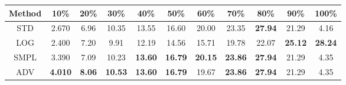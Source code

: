 \documentclass{standalone}
\begin{document}
\begin{tabular}{c|cccccccccc}
      \toprule
      Method & 10\% & 20\% & 30\% & 40\% & 50\% & 60\% & 70\% & 80\% & 90\% & 100\% \\
      \midrule
STD & 2.670 & 6.96 & 10.35 & 13.55 & 16.60 & 20.00 & 23.35 & \textbf{27.94} & 21.29 & 4.16\\
LOG & 2.400 & 7.20 & 9.91 & 12.19 & 14.56 & 15.71 & 19.78 & 22.07 & \textbf{25.12} & \textbf{28.24}\\
SMPL & 3.390 & 7.09 & 10.23 & \textbf{13.60} & \textbf{16.79} & \textbf{20.15} & \textbf{23.86} & \textbf{27.94} & 21.29 & 4.35\\
ADV & \textbf{4.010} & \textbf{8.06} & \textbf{10.53} & \textbf{13.60} & \textbf{16.79} & 19.67 & \textbf{23.86} & \textbf{27.94} & 21.29 & 4.35\\
  \bottomrule
\end{tabular}
\end{document}
